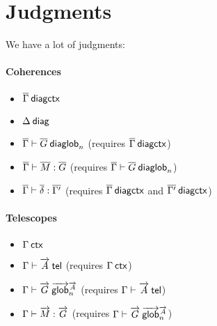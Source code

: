 \section{Judgments}

We have a lot of judgments:

\paragraph{Coherences}

\begin{small}
\begin{itemize}
\item $\wfdiagctx{\diag\Gamma}$
\item $\wfdiag{\Delta}$
\item $\wfdiaglob{\diag\Gamma}{\diag G}n$ (requires $\wfdiagctx{\diag\Gamma}$)
\item $\ofdiaglob{\diag\Gamma}{\diag M}{\diag G}$
(requires $\wfdiaglob{\diag\Gamma}{\diag G}n$)
\item $\substdiaglob{\diag\Gamma}{\diag \delta}{\diag{\Gamma'}}$
(requires $\wfdiagctx{\diag\Gamma}$ and $\wfdiagctx{\diag{\Gamma'}}$)
\end{itemize}
\end{small}


\paragraph{Telescopes}

\begin{small}
\begin{itemize}
\item $\wfctx{\Gamma}$
\item $\wftel{\Gamma}{\tel A}$ (requires $\wfctx{\Gamma}$)
\item $\wfglob{\Gamma}{\tel G}{\tel A}n$ (requires $\wftel{\Gamma}{\tel A}$)
\item $\ofglob{\Gamma}{\tel M}{\tel G}$
(requires $\wfglob{\Gamma}{\tel G}{\tel A}n$)
\end{itemize}
\end{small}

